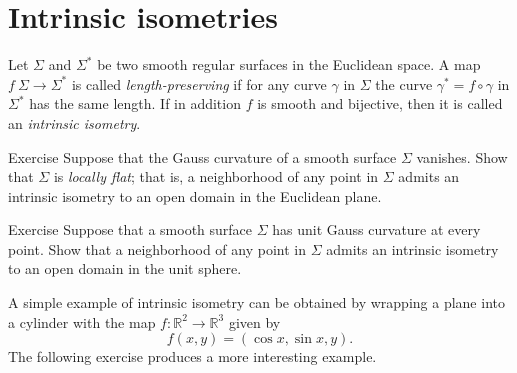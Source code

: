 \section{Intrinsic isometries}

Let $\Sigma$ and $\Sigma^{*}$ be two smooth regular surfaces in the Euclidean space.
A map $f\:\Sigma\to \Sigma^{*}$ is called  \emph{length-preserving} if for any curve $\gamma$ in $\Sigma$ the curve $\gamma^{*}=f\circ\gamma$ in $\Sigma^{*}$ has the same length. 
If in addition $f$ is smooth and bijective, then it is called an  \emph{intrinsic isometry}. 

\begin{thm}{Exercise}\label{ex:K=0}
Suppose that the Gauss curvature of a smooth surface $\Sigma$ vanishes.
Show that $\Sigma$ is \emph{locally flat};
that is, a neighborhood of any point in $\Sigma$ admits an intrinsic isometry to an open domain in the Euclidean plane.  
\end{thm}

\begin{thm}{Exercise}\label{ex:K=1}
Suppose that a smooth surface $\Sigma$ has unit Gauss curvature at every point.
Show that a neighborhood of any point in $\Sigma$ admits an intrinsic isometry to an open domain in the unit sphere.
\end{thm}

A simple example of intrinsic isometry can be obtained by wrapping a plane into a cylinder with the map $f: \mathbb{R}^2 \to \mathbb{R}^3$ given by 
\[  f(x,y) = (   \cos x , \sin x , y ) .    \]
The following exercise produces a more interesting example.

